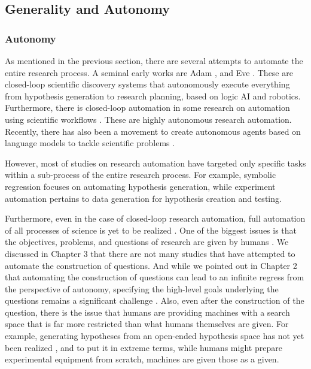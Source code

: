 \documentclass{article}
\begin{document}

\subsection{Generality and Autonomy}

\subsubsection{Autonomy}
As mentioned in the previous section, there are several attempts to automate the entire research process. A seminal early works are Adam \cite{king2004functional}, and Eve \cite{williams2015cheaper}. These are closed-loop scientific discovery systems that autonomously execute everything from hypothesis generation to research planning, based on logic AI and robotics. Furthermore, there is closed-loop automation in some research on automation using scientific workflows \cite{gil2017towards}. These are highly autonomous research automation. Recently, there has also been a movement to create autonomous agents based on language models to tackle scientific problems \cite{wang2023survey}.

However, most of studies on research automation have targeted  only specific tasks within a sub-process of the entire research process. For example, symbolic regression focuses on automating hypothesis generation, while experiment automation pertains to data generation for hypothesis creation and testing.

Furthermore, even in the case of closed-loop research automation,  full automation of all processes of science is yet to be realized \cite{zenil2023,coley2020autonomous,coley2020autonomousII}. One of the biggest issues is that the objectives, problems, and questions of research are given by humans \cite{coley2020autonomousII}. We discussed in Chapter 3 that there are not many studies that have attempted to automate the construction of questions. And while we pointed out in Chapter 2 that automating the construction of questions can lead to an infinite regress from the perspective of autonomy, specifying the high-level goals underlying the questions remains a significant challenge \cite{coley2020autonomousII}. Also, even after the construction of the question, there is the issue that humans are providing machines with a search space that is far more restricted than what humans themselves are given. For example, generating hypotheses from an open-ended hypothesis space has not yet been realized \cite{zenil2023,coley2020autonomousII}, and to put it in extreme terms, while humans might prepare experimental equipment from scratch, machines are given those as a given. 
\end{document}
